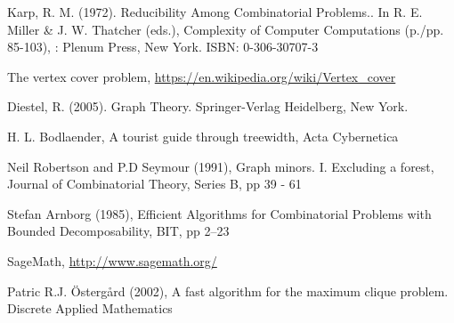 \documentclass[11pt,a4paper]{article}
\begin{document}


\begin{thebibliography}{9}

 Karp, R. M. (1972). Reducibility Among Combinatorial Problems.. In R. E. Miller \& J. W. Thatcher (eds.), Complexity of Computer Computations (p./pp. 85-103), : Plenum Press, New York. ISBN: 0-306-30707-3

 The vertex cover problem, \url{https://en.wikipedia.org/wiki/Vertex_cover}

 Diestel, R. (2005). Graph Theory. Springer-Verlag Heidelberg, New York. 

 H. L. Bodlaender, A tourist guide through treewidth, Acta Cybernetica

 Neil Robertson and P.D Seymour (1991), Graph minors. I. Excluding a forest, Journal of Combinatorial Theory, Series B, pp 39 - 61

 Stefan Arnborg (1985), Efficient Algorithms for Combinatorial Problems with Bounded Decomposability, BIT, pp 2--23

 SageMath, \url{http://www.sagemath.org/}

 Patric R.J. Östergård (2002), A fast algorithm for the maximum clique problem. Discrete Applied Mathematics

\end{thebibliography}
\end{document}
